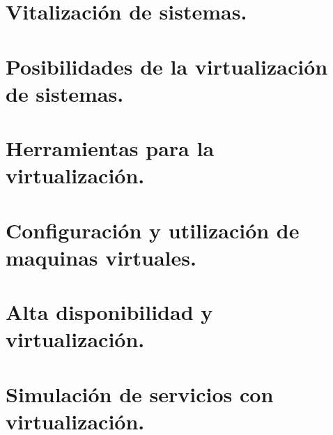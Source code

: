 \documentclass[letterpaper,10pt,spanish]{sphinxmanual}
\begin{document}
\section{Vitalización de sistemas.}
\label{\detokenize{tema_sad/tema_sad:vitalizacion-de-sistemas}}

\section{Posibilidades de la virtualización de sistemas.}
\label{\detokenize{tema_sad/tema_sad:posibilidades-de-la-virtualizacion-de-sistemas}}

\section{Herramientas para la virtualización.}
\label{\detokenize{tema_sad/tema_sad:herramientas-para-la-virtualizacion}}

\section{Configuración y utilización de maquinas virtuales.}
\label{\detokenize{tema_sad/tema_sad:configuracion-y-utilizacion-de-maquinas-virtuales}}

\section{Alta disponibilidad y virtualización.}
\label{\detokenize{tema_sad/tema_sad:alta-disponibilidad-y-virtualizacion}}

\section{Simulación de servicios con virtualización.}
\label{\detokenize{tema_sad/tema_sad:simulacion-de-servicios-con-virtualizacion}}


\renewcommand{\indexname}{Índice}
\printindex
\end{document}
